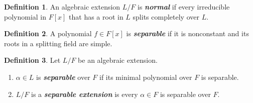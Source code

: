 \documentclass{article}
\makeatletter
\theoremstyle{definition}
\newtheorem{definition}{Definition}
\theoremstyle{remark}
\let\oldproofname=\proofname
\renewcommand{\proofname}{\bf{\textit{\oldproofname}}}
\theoremstyle{definition}
\renewenvironment{proof}[1][\proofname]{\par
  \pushQED{\qed}%
  \normalfont \topsep6\p@\@plus6\p@\relax
  \list{}{\leftmargin=0mm
          \rightmargin=0mm
          \settowidth{\itemindent}{\itshape#1}%
          \labelwidth=4mm
          \parsep=0pt \listparindent=0mm%
  }
  \item[\hskip\labelsep
        \itshape
    #1\@addpunct{.}]\ignorespaces
}{%
  \popQED\endlist\@endpefalse
}
\makeatother
\begin{document}
        \begin{proof}
            
        \end{proof}
    \begin{definition}
        An algebraic extension $L/F$ is \textbf{\textit{normal}} if every irreducible polynomial in $F[x]$ that has a root in $L$ splits completely over $L$.
    \end{definition}
    \begin{definition}
        A polynomial $f\in F[x]$ is \textbf{\textit{separable}} if it is nonconstant and its roots in a splitting field are simple.
    \end{definition}
    \begin{definition}
        Let $L/F$ be an algebraic extension.
            \begin{enumerate}
                \item $\alpha\in L$ is \textbf{\textit{separable}} over $F$ if its minimal polynomial over $F$ is separable.
                \item $L/F$ is a \textbf{\textit{separable extension}} is every $\alpha\in F$ is separable over $F$.
            \end{enumerate}
    \end{definition}
\end{document}
